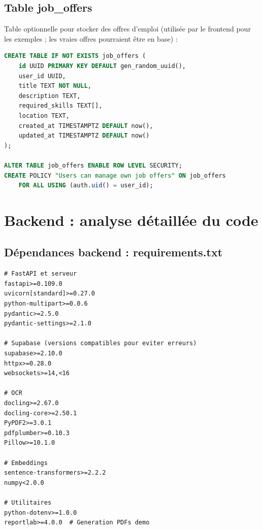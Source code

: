 \documentclass[11pt,a4paper]{report}
\begin{document}
\section{Table job\_offers}

Table optionnelle pour stocker des offres d'emploi (utilisée par le frontend pour les exemples ; les vraies offres pourraient être en base) :

\begin{lstlisting}[caption={Table job_offers}, language=SQL]
CREATE TABLE IF NOT EXISTS job_offers (
    id UUID PRIMARY KEY DEFAULT gen_random_uuid(),
    user_id UUID,
    title TEXT NOT NULL,
    description TEXT,
    required_skills TEXT[],
    location TEXT,
    created_at TIMESTAMPTZ DEFAULT now(),
    updated_at TIMESTAMPTZ DEFAULT now()
);

ALTER TABLE job_offers ENABLE ROW LEVEL SECURITY;
CREATE POLICY "Users can manage own job offers" ON job_offers
    FOR ALL USING (auth.uid() = user_id);
\end{lstlisting}

\chapter{Backend : analyse détaillée du code}

\section{Dépendances backend : requirements.txt}

\begin{lstlisting}[caption={requirements.txt — dépendances Python}, language=text]
# FastAPI et serveur
fastapi>=0.109.0
uvicorn[standard]>=0.27.0
python-multipart>=0.0.6
pydantic>=2.5.0
pydantic-settings>=2.1.0

# Supabase (versions compatibles pour eviter erreurs)
supabase>=2.10.0
httpx>=0.28.0
websockets>=14,<16

# OCR
docling>=2.67.0
docling-core>=2.50.1
PyPDF2>=3.0.1
pdfplumber>=0.10.3
Pillow>=10.1.0

# Embeddings
sentence-transformers>=2.2.2
numpy<2.0.0

# Utilitaires
python-dotenv>=1.0.0
reportlab>=4.0.0  # Generation PDFs demo
\end{lstlisting}
\end{document}
